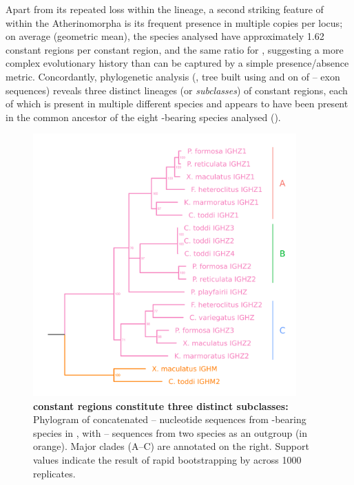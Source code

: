 Apart from its repeated loss within the lineage, a second striking feature of  within the Atherinomorpha is its frequent presence in multiple copies per \igh{} locus; on average (geometric mean), the species analysed have approximately 1.62  constant regions per  constant region, and the same ratio for , suggesting a more complex evolutionary history than can be captured by a simple presence/absence metric. Concordantly, phylogenetic analysis (, tree built using  and  on of -- exon sequences) reveals three distinct lineages (or \textit{subclasses}) of  constant regions, each of which is present in multiple different species and appears to have been present in the common ancestor of the eight -bearing species analysed ().

\begin{figure}
	\centering
	\includegraphics[width=0.9\textwidth]{_Figures/png/multispecies-cz-tree}
	\caption[ constant regions constitute three distinct subclasses]{\textbf{ constant regions constitute three distinct subclasses:} 
	Phylogram of concatenated -- nucleotide sequences from -bearing species in , with -- sequences from two species as an outgroup (in orange). Major clades (A--C) are annotated on the right. Support values indicate the result of rapid bootstrapping by  across 1000 replicates.}
	\label{fig:multispecies-cz-tree}
\end{figure}

